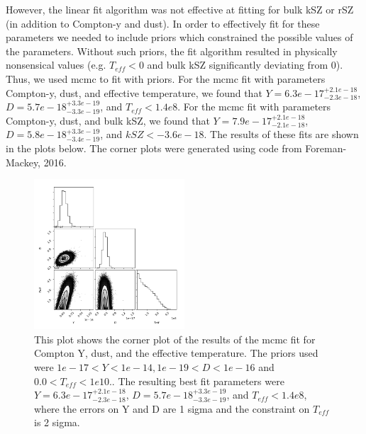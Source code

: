 \documentclass{princeton_astro_thesis}
\begin{document}
\par However, the linear fit algorithm was not effective at fitting for bulk kSZ or rSZ (in addition to Compton-y and dust). In order to effectively fit for these parameters we needed to include priors which constrained the possible values of the parameters. Without such priors, the fit algorithm resulted in physically nonsensical values (e.g. $T_{eff}<0$ and bulk kSZ significantly deviating from 0). Thus, we used mcmc to fit with priors. For the mcmc fit with parameters Compton-y, dust, and effective temperature, we found that $Y=6.3e-17^{+2.1e-18}_{-2.3e-18}$, $D=5.7e-18^{+3.3e-19}_{-3.3e-19}$, and $T_{eff}<1.4e8$. For the mcmc fit with parameters Compton-y, dust, and bulk kSZ, we found that $Y=7.9e-17^{+2.1e-18}_{-2.1e-18}$, $D=5.8e-18^{+3.3e-19}_{-3.4e-19}$, and $kSZ<-3.6e-18$. The results of these fits are shown in the plots below. The corner plots were generated using code from Foreman-Mackey, 2016. 

\begin{figure}[h]
\centering
\includegraphics[width=0.5\textwidth]{../CornerTeffplot.png}
\caption{This plot shows the corner plot of the results of the mcmc fit for Compton Y, dust, and the effective temperature. The priors used were $ 1e-17 < Y < 1e-14, 1e-19< D < 1e-16$ and $0.0 < T_{eff} <1e10.$. The resulting best fit parameters were $Y=6.3e-17^{+2.1e-18}_{-2.3e-18}$, $D=5.7e-18^{+3.3e-19}_{-3.3e-19}$, and $T_{eff}<1.4e8$, where the errors on Y and D are 1 sigma and the constraint on $T_{eff}$ is 2 sigma.}
\end{figure}
\end{document}
